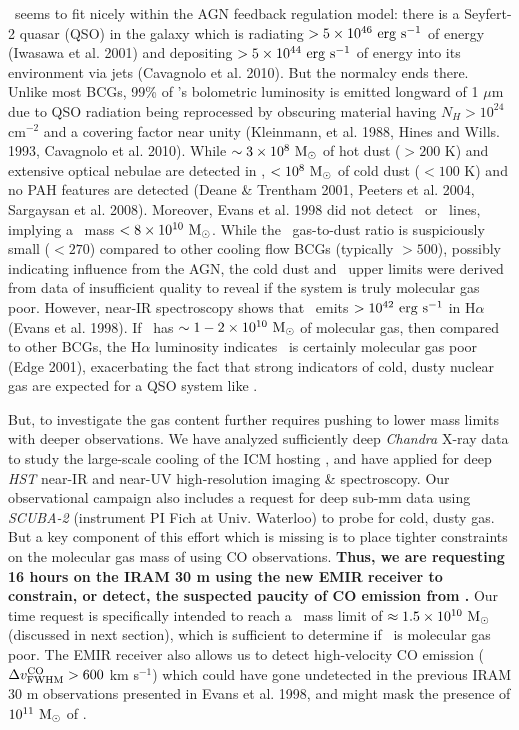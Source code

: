 \documentclass[11pt]{article}
\begin{document}
\irs\ seems to fit nicely within the AGN feedback regulation model:
there is a Seyfert-2 quasar (QSO) in the galaxy which is radiating $>
5 \times 10^{46} ~\mathrm{erg~s^{-1}}$ of energy (Iwasawa et al. 2001) and depositing
$> 5 \times 10^{44} ~\mathrm{erg~s^{-1}}$ of energy into its environment via jets
(Cavagnolo et al. 2010). But the normalcy ends there. Unlike most
BCGs, 99\% of \irs's bolometric luminosity is emitted longward of 1
$\mu$m due to QSO radiation being reprocessed by obscuring material
having $N_H > 10^{24}$ cm$^{-2}$ and a covering factor near unity
(Kleinmann, et al. 1988, Hines and Wills. 1993, Cavagnolo et
al. 2010). While $\sim 3 \times 10^8 ~\mathrm{M}_{\odot}$ of hot dust ($>200$ K)
and extensive optical nebulae are detected in \irs, $< 10^8 ~\mathrm{M}_{\odot}$ of
cold dust ($< 100$ K) and no PAH features are detected (Deane \&
Trentham 2001, Peeters et al. 2004, Sargaysan et al. 2008). Moreover,
Evans et al. 1998 did not detect \coto\ or \cott\ lines, implying a
\htoo\ mass $< 8 \times 10^{10} ~\mathrm{M}_{\odot}$. While the \irs\ gas-to-dust
ratio is suspiciously small ($< 270$) compared to other cooling flow
BCGs (typically $> 500$), possibly indicating influence from the AGN,
the cold dust and \htoo\ upper limits were derived from data of
insufficient quality to reveal if the system is truly molecular gas
poor. However, near-IR spectroscopy shows that \irs\ emits $> 10^{42}
~\mathrm{erg~s^{-1}}$ in H$\alpha$ (Evans et al. 1998). If \irs\ has $\sim 1-2 \times
10^{10} ~\mathrm{M}_{\odot}$ of molecular gas, then compared to other BCGs, the
H$\alpha$ luminosity indicates \irs\ is certainly molecular gas poor
(Edge 2001), exacerbating the fact that strong indicators of cold,
dusty nuclear gas are expected for a QSO system like \irs.

But, to investigate the gas content further requires pushing to lower
mass limits with deeper observations. We have analyzed sufficiently
deep {\it{Chandra}} X-ray data to study the large-scale cooling of the
ICM hosting \irs, and have applied for deep {\it{HST}} near-IR and
near-UV high-resolution imaging \& spectroscopy. Our observational
campaign also includes a request for deep sub-mm data using
{\it{SCUBA-2}} (instrument PI Fich at Univ. Waterloo) to probe for
cold, dusty gas. But a key component of this effort which is missing
is to place tighter constraints on the molecular gas mass of using CO
observations. {\bf{Thus, we are requesting 16 hours on the IRAM 30 m
    using the new EMIR receiver to constrain, or detect, the suspected
    paucity of CO emission from \iras.}}  Our time request is
specifically intended to reach a \htoo\ mass limit of $\approx 1.5
\times 10^{10} ~\mathrm{M}_{\odot}$ (discussed in next section), which is
sufficient to determine if \irs\ is molecular gas poor. The EMIR
receiver also allows us to detect high-velocity CO emission ($\Delta v^{\mathrm{CO}}_{\mathrm{FWHM}} >
600$ km s$^{-1}$) which could have gone undetected in the previous
IRAM 30 m observations presented in Evans et al. 1998, and might mask
the presence of $10^{11} ~\mathrm{M}_{\odot}$ of \htoo.
\end{document}
